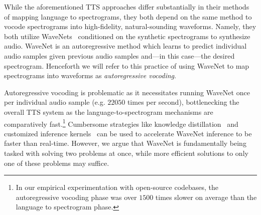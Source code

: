 \documentclass[a4paper]{article}
\begin{document}

While the aforementioned TTS approaches differ substantially in their methods of mapping language to spectrograms, they both depend on the same method to vocode spectrograms into high-fidelity, natural-sounding waveforms. 
Namely, they both utilize WaveNets~\cite{oord2016wavenet} conditioned on the synthetic spectrograms to synthesize audio. 
WaveNet is an autoregressive method which learns to predict individual audio samples given previous audio samples and---in this case---the desired spectrogram. 
Henceforth we will refer to this practice of using WaveNet to map spectrograms into waveforms as \emph{autoregressive vocoding}. 

Autoregressive vocoding is problematic as it necessitates running WaveNet once per individual audio sample (e.g. $22050$ times per second), bottlenecking the overall TTS system as the language-to-spectrogram mechanisms are comparatively fast.\footnote{In our empirical experimentation with open-source codebases, the autoregressive vocoding phase was over $1500$ times slower on average than the language to spectrogram phase.} 
Cumbersome
strategies like knowledge distillation~\cite{hinton2015distilling} and customized inference kernels~\cite{arik2017deep} can be used to accelerate WaveNet inference to be faster than real-time. 
However, 
we argue that WaveNet is fundamentally being tasked with solving two problems at once, 
while more efficient solutions to only one of these problems may suffice.

\end{document}
